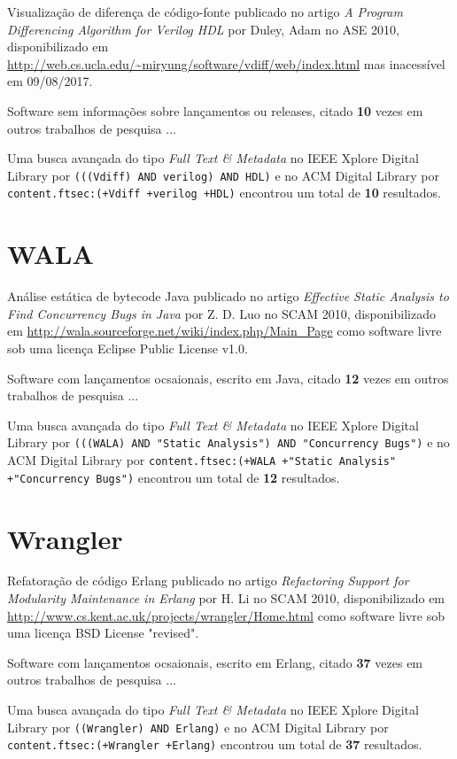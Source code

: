 Visualização de diferença de código-fonte
publicado no artigo {\it A Program Differencing Algorithm for Verilog HDL}
por Duley, Adam
no ASE 2010,
disponibilizado em \url{http://web.cs.ucla.edu/~miryung/software/vdiff/web/index.html}
mas inacessível em 09/08/2017.

Software sem informações sobre lançamentos ou releases,
citado {\bf 10} vezes em outros trabalhos de pesquisa ...

Uma busca avançada do tipo {\it Full Text \& Metadata} no IEEE Xplore Digital Library por
\texttt{(((Vdiff) AND verilog) AND HDL)}
e no ACM Digital Library por
\texttt{content.ftsec:(+Vdiff +verilog +HDL)}
encontrou um total de
{\bf 10}
resultados.

\section{WALA}

Análise estática de bytecode Java
publicado no artigo {\it Effective Static Analysis to Find Concurrency Bugs in Java}
por Z. D. Luo
no SCAM 2010,
disponibilizado em \url{http://wala.sourceforge.net/wiki/index.php/Main_Page}
como software livre
sob uma licença Eclipse Public License v1.0.

Software com lançamentos ocsaionais,
escrito em Java,
citado {\bf 12} vezes em outros trabalhos de pesquisa ...

Uma busca avançada do tipo {\it Full Text \& Metadata} no IEEE Xplore Digital Library por
\texttt{(((WALA) AND "Static Analysis") AND "Concurrency Bugs")}
e no ACM Digital Library por
\texttt{content.ftsec:(+WALA +"Static Analysis" +"Concurrency Bugs")}
encontrou um total de
{\bf 12}
resultados.

\section{Wrangler}

Refatoração de código Erlang
publicado no artigo {\it Refactoring Support for Modularity Maintenance in Erlang}
por H. Li
no SCAM 2010,
disponibilizado em \url{http://www.cs.kent.ac.uk/projects/wrangler/Home.html}
como software livre
sob uma licença BSD License "revised".

Software com lançamentos ocsaionais,
escrito em Erlang,
citado {\bf 37} vezes em outros trabalhos de pesquisa ...

Uma busca avançada do tipo {\it Full Text \& Metadata} no IEEE Xplore Digital Library por
\texttt{((Wrangler) AND Erlang)}
e no ACM Digital Library por
\texttt{content.ftsec:(+Wrangler +Erlang)}
encontrou um total de
{\bf 37}
resultados.

